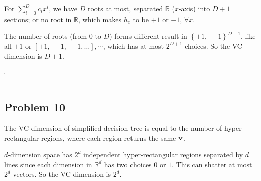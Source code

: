 \documentclass[12pt]{article}
\newcommand*{\QEDB}{\hfill\ensuremath{\square}}
\newcommand{\CBrackets}[1]{\left\{#1\right\}}
\newcommand{\SBrackets}[1]{\left[#1\right]}
\newcommand{\ParTh}[1]{\left(#1\right)}
\newcommand{\BF}[1]{{\bf#1}}
\newcommand{\horrule}[1]{\rule{\linewidth}{#1}}
\begin{document}

For $\sum_{i=0}^{D}c_ix^i$, we have $D$ roots at most, separated $\mathbb{R}$ ($x$-axis) into $D+1$ sections; or no root in $\mathbb{R}$, which makes $h_c$ to be $+1$ or $-1$, $\forall x$.

The number of roots (from $0$ to $D$) forms different result in $\CBrackets{+1,~-1}^{D+1}$, like all $+1$ or $\SBrackets{+1,~-1,~+1,\ldots},\cdots$, which has at most $2^{D+1}$ choices. So the VC dimension is $D+1$.

\QEDB

\horrule{0.5pt}

\subsection*{Problem 10}

The VC dimension of simplified decision tree is equal to the number of hyper-rectangular regions, where each region returns the same $\BF{v}$.

$d$-dimension space has $2^d$ independent hyper-rectangular regions separated by $d$ lines since each dimension in $\mathbb{R}^d$ has two choices $0$ or $1$. This can shatter at most $2^d$ vectors. So the VC dimension is $2^d$.
\end{document}
